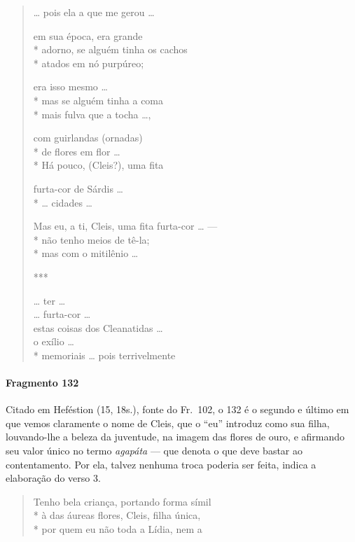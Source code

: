 \begin{verse}
\ldots{} pois ela a que me gerou \ldots{}


em sua época, era grande \\*
adorno, se alguém tinha os cachos\\*
atados em nó purpúreo;


era isso mesmo \ldots{} \\*
mas se alguém tinha a coma\\*
mais fulva que a tocha \ldots{},

com guirlandas (ornadas)\\*
de flores em flor \ldots{}\\*
Há pouco, (Cleis?), uma fita

furta-cor de Sárdis \ldots{}\\*
\ldots{} cidades \ldots{}

Mas eu, a ti, Cleis, uma fita furta-cor \ldots{} ---\\*
não tenho meios de tê-la; \\*
mas com o mitilênio \ldots{}

***

\ldots{} ter \ldots{}\\
\ldots{} furta-cor \ldots{}\\
estas coisas dos Cleanatidas \ldots{}\\
o exílio \ldots{}\\*
memoriais \ldots{} pois terrivelmente 
\end{verse}

\paragraph{Fragmento 132}

{\small Citado em Heféstion (15, 18s.), fonte do Fr.~102, o 132 é o segundo e último em que vemos claramente o nome de Cleis, que o “eu” introduz como sua filha, louvando-lhe a
beleza da juventude, na imagem das flores de ouro, e afirmando seu valor único no termo \textit{agapáta} --- que denota o que deve bastar ao contentamento. Por ela,  talvez nenhuma troca poderia ser feita, indica a elaboração do verso 3.}

\begin{verse}
Tenho bela criança, portando forma símil\\*
à das áureas flores, Cleis, filha única,\\*
por quem eu não toda a Lídia, nem a 
\end{verse}


